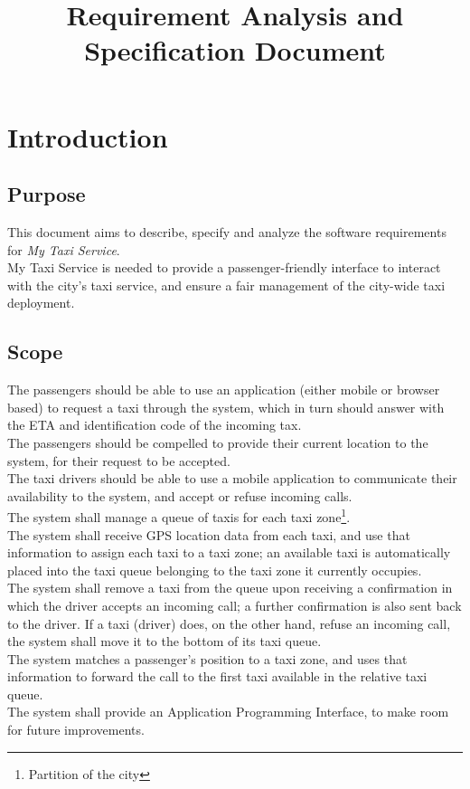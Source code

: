 \documentclass[a4paper,11pt]{report}
\title{Requirement Analysis and Specification Document}
\author{}
\begin{document}
\maketitle
\tableofcontents

\chapter*{Introduction}
\addtocounter{chapter}{1}

\section{Purpose}
This document aims to describe, specify and analyze the software requirements for \textit{My Taxi Service}. \\
My Taxi Service is needed to provide a passenger-friendly interface to interact with the city's taxi service, and ensure
a fair management of the city-wide taxi deployment.

\section{Scope}
The passengers should be able to use an application (either mobile or browser based) to request a taxi through the system,
which in turn should answer with the ETA and identification code of the incoming tax. \\
The passengers should be compelled to provide their current location to the system, for their request to be accepted. \\
The taxi drivers should be able to use a mobile application to communicate their availability to the system, and accept
 or refuse incoming calls. \\
The system shall manage a queue of taxis for each taxi zone\footnote{Partition of the city}. \\
The system shall receive GPS location data from each taxi, and use that information to assign each taxi to a 
taxi zone; an available taxi is automatically placed into the taxi queue belonging to the taxi zone it currently occupies. \\
The system shall remove a taxi from the queue upon receiving a confirmation in which the driver accepts an incoming call; a
further confirmation is also sent back to the driver. If a taxi (driver) does, on the other hand, refuse an incoming call, the system
shall move it to the bottom of its taxi queue. \\
The system matches a passenger's position to a taxi zone, and uses that information to forward the call to the first taxi
available in the relative taxi queue. \\
The system shall provide an Application Programming Interface, to make room for future improvements.
\end{document}
